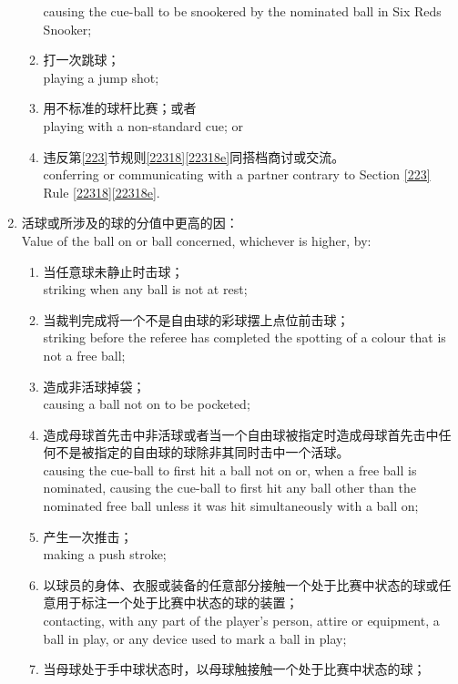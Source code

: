 \begin{enumerate}[label=(\alph*),start=1]
\begin{enumerate}[label=(\roman*)]
        causing the cue-ball to be snookered by the nominated ball in Six Reds Snooker;
        \item 打一次跳球；\\
        playing a jump shot;
        \item 用不标准的球杆比赛；或者\\
        playing with a non-standard cue; or
        \item 违反第\ref{223}节规则\ref{22318}\ref{22318e}同搭档商讨或交流。\\
        conferring or communicating with a partner contrary to Section \ref{223} Rule \ref{22318}\ref{22318e}.
    \end{enumerate}
    \item \label{22311b}活球或所涉及的球的分值中更高的因：\\
    Value of the ball on or ball concerned, whichever is higher, by:
    \begin{enumerate}[label=(\roman*)]
        \item 当任意球未静止时击球；\\
        striking when any ball is not at rest;
        \item \label{22311bii}当裁判完成将一个不是自由球的彩球摆上点位前击球；\\
        striking before the referee has completed the spotting of a colour that is not a free ball;
        \item 造成非活球掉袋；\\
        causing a ball not on to be pocketed;
        \item 造成母球首先击中非活球或者当一个自由球被指定时造成母球首先击中任何不是被指定的自由球的球除非其同时击中一个活球。\\
        causing the cue-ball to first hit a ball not on or, when a free ball is nominated, causing the cue-ball to first hit any ball other than the nominated free ball unless it was hit simultaneously with a ball on;
        \item 产生一次推击；\\
        making a push stroke;
        \item 以球员的身体、衣服或装备的任意部分接触一个处于比赛中状态的球或任意用于标注一个处于比赛中状态的球的装置；\\
        contacting, with any part of the player's person, attire or equipment, a ball in play, or any device used to mark a ball in play;
        \item 当母球处于手中球状态时，以母球触接触一个处于比赛中状态的球；\\

\end{enumerate}
\end{enumerate}
